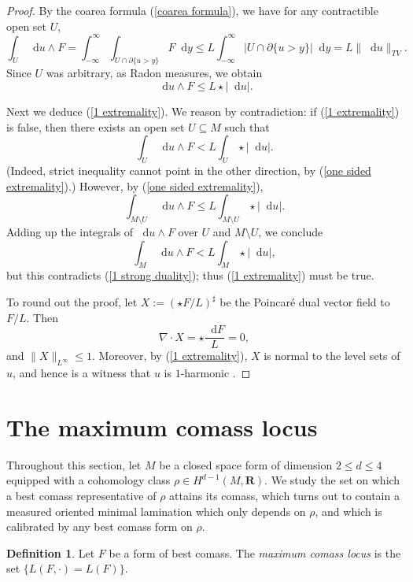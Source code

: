 \documentclass[reqno,11pt]{amsart}
\newcommand{\RR}{\mathbf{R}}
\newcommand*\dif{\mathop{}\!\mathrm{d}}
\newcommand{\dfn}[1]{\emph{#1}\index{#1}}
\theoremstyle{definition}
\newtheorem{definition}[theorem]{Definition}
\numberwithin{equation}{section}
\begin{document}
\begin{proof}
By the coarea formula (\ref{coarea formula}), we have for any contractible open set $U$,
$$\int_U \dif u \wedge F = \int_{-\infty}^\infty \int_{U \cap \partial \{u > y\}} F \dif y \leq L \int_{-\infty}^\infty |U \cap \partial \{u > y\}| \dif y = L \|\dif u\|_{TV}.$$
Since $U$ was arbitrary, as Radon measures, we obtain
\begin{equation}\label{one sided extremality}
\dif u \wedge F \leq L \star |\dif u|.
\end{equation}

Next we deduce (\ref{1 extremality}).
We reason by contradiction: if (\ref{1 extremality}) is false, then there exists an open set $U \subseteq M$ such that 
$$\int_U \dif u \wedge F < L \int_U \star |\dif u|.$$
(Indeed, strict inequality cannot point in the other direction, by (\ref{one sided extremality}).)
However, by (\ref{one sided extremality}), 
$$\int_{M \setminus U} \dif u \wedge F \leq L \int_{M \setminus U} \star |\dif u|.$$
Adding up the integrals of $\dif u \wedge F$ over $U$ and $M \setminus U$, we conclude 
$$\int_M \dif u \wedge F < L \int_M \star |\dif u|,$$
but this contradicts (\ref{1 strong duality}); thus (\ref{1 extremality}) must be true.

To round out the proof, let $X := (\star F/L)^\sharp$ be the Poincar\'e dual vector field to $F/L$. Then
$$\nabla \cdot X = \star \frac{\dif F}{L} = 0,$$
and $\|X\|_{L^\infty} \leq 1$.
Moreover, by (\ref{1 extremality}), $X$ is normal to the level sets of $u$, and hence is a witness that $u$ is $1$-harmonic \cite{Mazon14}.
\end{proof}



\section{The maximum comass locus}\label{MCL sec}
Throughout this section, let $M$ be a closed space form of dimension $2 \leq d \leq 4$ equipped with a cohomology class $\rho \in H^{d - 1}(M, \RR)$.
We study the set on which a best comass representative of $\rho$ attains its comass, which turns out to contain a measured oriented minimal lamination which only depends on $\rho$, and which is calibrated by any best comass form on $\rho$.

\begin{definition}
Let $F$ be a form of best comass.
The \dfn{maximum comass locus} is the set $\{L(F, \cdot) = L(F)\}$.
\end{definition}
\end{document}
